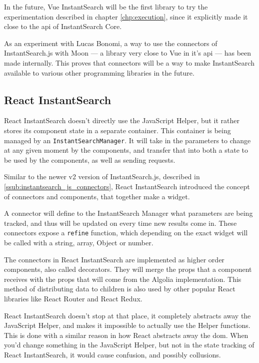 In the future, Vue InstantSearch will be the first \gls{library} to try the experimentation described in chapter \ref{chp:execution}, since it explicitly made it close to the \acrshort{api} of InstantSearch Core.

As an experiment with Lucas Bonomi, a way to use the connectors of InstantSearch.js with Moon --- a \gls{library} very close to Vue in it's \acrshort{api} --- has been made internally. This proves that connectors will be a way to make InstantSearch available to various other programming libraries in the future.




\subsection{React InstantSearch} %
\label{sub:react_instantearch}

React InstantSearch doesn't directly use the JavaScript Helper, but it rather stores its component state in a separate container. This container is being managed by an {\tt InstantSearchManager}. It will take in the parameters to change at any given moment by the components, and transfer that into both a state to be used by the components, as well as sending requests.

Similar to the newer v2 version of InstantSearch.js, described in \ref{ssub:instantsearch_js_connectors}, React InstantSearch introduced the concept of connectors and components, that together make a widget.

A connector will define to the InstantSearch Manager what parameters are being tracked, and thus will be updated on every time new results come in. These connectors expose a {\tt refine} function, which depending on the exact widget will be called with a string, array, Object or number.

The connectors in React InstantSearch are implemented as higher order components, also called decorators. They will merge the \gls{props} that a component receives with the \gls{props} that will come from the Algolia implementation. This method of distributing data to children is also used by other popular React libraries like React Router and React Redux.

React InstantSearch doesn't stop at that place, it completely abstracts away the JavaScript Helper, and makes it impossible to actually use the Helper functions. This is done with a similar reason in how React abstracts away the \acrshort{dom}. When you'd change something in the JavaScript Helper, but not in the state tracking of React InstantSearch, it would cause confusion, and possibly collusions.

